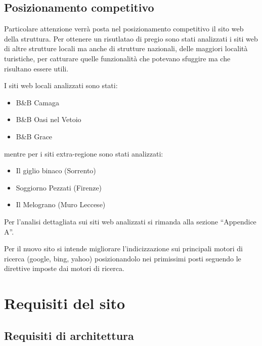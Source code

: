 \documentclass[a4paper,12pt,hidelinks]{report}
\begin{document}
\section{Posizionamento competitivo}
Particolare attenzione verrà posta nel posizionamento competitivo il sito web della struttura. Per ottenere un risutlatao di pregio sono stati analizzati i siti web di altre strutture
locali ma anche di strutture nazionali, delle maggiori località turistiche, per catturare quelle funzionalità che potevano sfuggire ma che risultano essere utili.
\par I siti web locali analizzati sono stati:
\begin{itemize}
 \item B\&B Camaga
 \item B\&B Oasi nel Vetoio
 \item B\&B Grace
\end{itemize}
mentre per i siti extra-regione sono stati analizzati:
\begin{itemize}
 \item Il giglio binaco (Sorrento)
 \item Soggiorno Pezzati (Firenze)
 \item Il Melograno (Muro Leccese)
\end{itemize}
Per l'analisi dettagliata sui siti web analizzati si rimanda alla sezione ``Appendice A''.
\par Per il nuovo sito si intende migliorare l'indicizzazione sui principali motori di ricerca (google, bing, yahoo) posizionandolo nei primissimi posti 
seguendo le direttive imposte dai motori di ricerca.

\chapter{Requisiti del sito}

\section{Requisiti di architettura}
\end{document}
